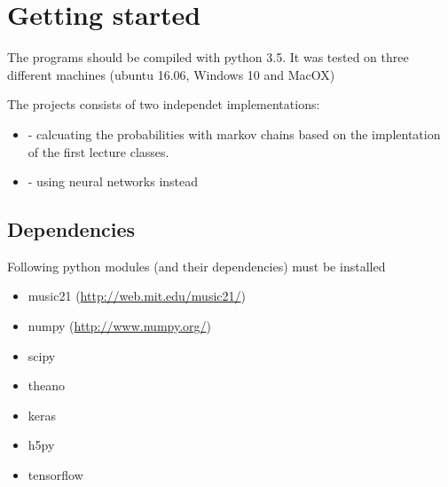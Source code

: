 \documentclass[letterpaper,10pt,english]{sphinxmanual}
\begin{document}
\begin{sphinxVerbatim}[commandchars=\\\{\}]
\end{sphinxVerbatim}
\begin{quote}
\label{getting_started:getting-started}\end{quote}


\chapter{Getting started}
\label{getting_started:getting-started}\label{getting_started::doc}\label{getting_started:id1}
The programs should be compiled with python 3.5.
It was tested on three different machines (ubuntu 16.06, Windows 10 and MacOX)

The projects consists of two independet implementations:
\begin{itemize}
\item {} 
 - calcuating the probabilities with markov chains based on the implentation of the first lecture classes.

\item {} 
 - using neural networks instead

\end{itemize}


\section{Dependencies}
\label{getting_started:dependencies}
Following python modules (and their dependencies) must be installed
\begin{itemize}
\item {} 
music21 (\url{http://web.mit.edu/music21/})

\item {} 
numpy (\url{http://www.numpy.org/})

\item {} 
scipy

\item {} 
theano

\item {} 
keras

\item {} 
h5py

\item {} 
tensorflow

\end{itemize}
\end{document}
